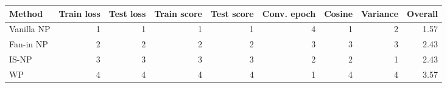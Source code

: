 \begin{tabular}{lrrrrrrrr}
\toprule
Method & Train loss & Test loss & Train score & Test score & Conv. epoch & Cosine & Variance & Overall \\
\midrule
Vanilla NP & 1 & 1 & 1 & 1 & 4 & 1 & 2 & 1.57 \\
Fan-in NP & 2 & 2 & 2 & 2 & 3 & 3 & 3 & 2.43 \\
IS-NP & 3 & 3 & 3 & 3 & 2 & 2 & 1 & 2.43 \\
WP & 4 & 4 & 4 & 4 & 1 & 4 & 4 & 3.57 \\
\bottomrule
\end{tabular}
